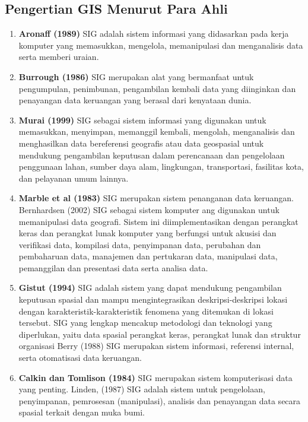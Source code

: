 \subsection{Pengertian GIS Menurut Para Ahli}
\begin{enumerate}

\item \textbf{Aronaff (1989)}
\subitem SIG adalah sistem informasi yang didasarkan pada kerja komputer yang memasukkan, mengelola, memanipulasi dan menganalisis data serta memberi uraian.

\item \textbf{Burrough (1986)}
\subitem SIG merupakan alat yang bermanfaat untuk pengumpulan, penimbunan, pengambilan kembali data yang diinginkan dan penayangan data keruangan yang berasal dari kenyataan dunia.

\item \textbf{Murai (1999)}
\subitem SIG sebagai sistem informasi yang digunakan untuk memasukkan, menyimpan, memanggil kembali, mengolah, menganalisis dan menghasilkan data bereferensi geografis atau data geospasial untuk mendukung pengambilan keputusan dalam perencanaan dan pengelolaan penggunaan lahan, sumber daya alam, lingkungan, transportasi, fasilitas kota, dan pelayanan umum lainnya.

\item \textbf{Marble et al (1983)}
\subitem SIG merupakan sistem penanganan data keruangan.  Bernhardsen (2002) SIG sebagai sistem komputer ang digunakan untuk memanipulasi data geografi. Sistem ini diimplementasikan dengan perangkat keras dan perangkat lunak komputer yang berfungsi untuk akusisi dan verifikasi data, kompilasi data, penyimpanan data, perubahan dan pembaharuan data, manajemen dan pertukaran data, manipulasi data, pemanggilan dan presentasi data serta analisa data.

\item \textbf{Gistut (1994)}
\subitem SIG adalah sistem yang dapat mendukung pengambilan keputusan spasial dan mampu mengintegrasikan deskripsi-deskripsi lokasi dengan karakteristik-karakteristik fenomena yang ditemukan di lokasi tersebut. SIG yang lengkap mencakup metodologi dan teknologi yang diperlukan, yaitu data spasial perangkat keras, perangkat lunak dan struktur organisasi  Berry (1988) SIG merupakan sistem informasi, referensi internal, serta otomatisasi data keruangan.

\item \textbf{Calkin dan Tomlison (1984)}
\subitem SIG merupakan sistem komputerisasi data yang penting.  Linden, (1987) SIG adalah sistem untuk pengelolaan, penyimpanan, pemrosesan (manipulasi), analisis dan penayangan data secara spasial terkait dengan muka bumi.


\end{enumerate}
